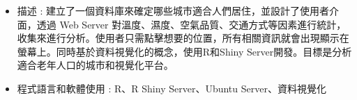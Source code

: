 \documentclass{resume}
\begin{document}
\begin{itemize}[parsep=0.5ex]
  \item 描述 : 建立了一個資料庫來確定哪些城市適合人們居住，並設計了使用者介面，透過 Web Server 對溫度、濕度、空氣品質、交通方式等因素進行統計，收集來進行分析。使用者只需點擊想要的位置，所有相關資訊就會出現顯示在螢幕上。同時基於資料視覺化的概念，使用R和Shiny Server開發。目標是分析適合老年人口的城市和視覺化平台。
  \item 程式語言和軟體使用 : R、R Shiny Server、Ubuntu Server、資料視覺化
\end{itemize}
\end{document}
